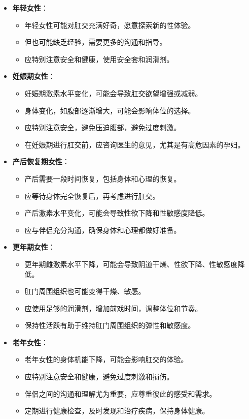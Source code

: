 \documentclass[12pt,UTF8]{ctexbook}
\begin{document}
\begin{itemize}
	\item \textbf{年轻女性}：
	\begin{itemize}
		\item 年轻女性可能对肛交充满好奇，愿意探索新的性体验。
		\item 但也可能缺乏经验，需要更多的沟通和指导。
		\item 应特别注意安全和健康，使用安全套和润滑剂。
	\end{itemize}
	\item \textbf{妊娠期女性}：
	\begin{itemize}
		\item 妊娠期激素水平变化，可能会导致肛交欲望增强或减弱。
		\item 身体变化，如腹部逐渐增大，可能会影响体位的选择。
		\item 应特别注意安全，避免压迫腹部，避免过度刺激。
		\item 在妊娠期进行肛交前，应咨询医生的意见，尤其是有高危因素的孕妇。
	\end{itemize}
	\item \textbf{产后恢复期女性}：
	\begin{itemize}
		\item 产后需要一段时间恢复，包括身体和心理的恢复。
		\item 应等待身体完全恢复后，再考虑进行肛交。
		\item 产后激素水平变化，可能会导致性欲下降和性敏感度降低。
		\item 应与伴侣充分沟通，确保身体和心理都做好准备。
	\end{itemize}
	\item \textbf{更年期女性}：
	\begin{itemize}
		\item 更年期雌激素水平下降，可能会导致阴道干燥、性欲下降、性敏感度降低。
		\item 肛门周围组织也可能变得干燥、敏感。
		\item 应使用足够的润滑剂，增加前戏时间，调整体位和节奏。
		\item 保持性活跃有助于维持肛门周围组织的弹性和敏感度。
	\end{itemize}
	\item \textbf{老年女性}：
	\begin{itemize}
		\item 老年女性的身体机能下降，可能会影响肛交的体验。
		\item 应特别注意安全和健康，避免过度刺激和损伤。
		\item 伴侣之间的沟通和理解尤为重要，应尊重彼此的感受和需求。
		\item 定期进行健康检查，及时发现和治疗疾病，保持身体健康。
	\end{itemize}
\end{itemize}
\end{document}
